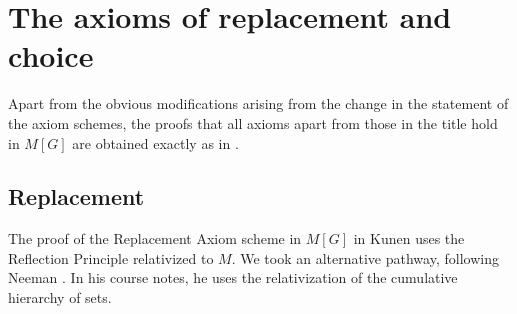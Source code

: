 \section{The axioms of replacement and choice}
\label{sec:axioms-replacement-choice}

Apart from the obvious modifications arising from the change in the
statement of the axiom schemes, the proofs that all axioms apart from
those in the title hold in $M[G]$ are obtained exactly as in
\cite{2019arXiv190103313G}. 

\subsection{Replacement}

The proof of the Replacement Axiom scheme in $M[G]$ in Kunen uses the
Reflection Principle relativized to $M$. We took an alternative
pathway, following Neeman \cite{neeman-course}. In his course notes,
he uses the relativization of the cumulative hierarchy of sets. 

